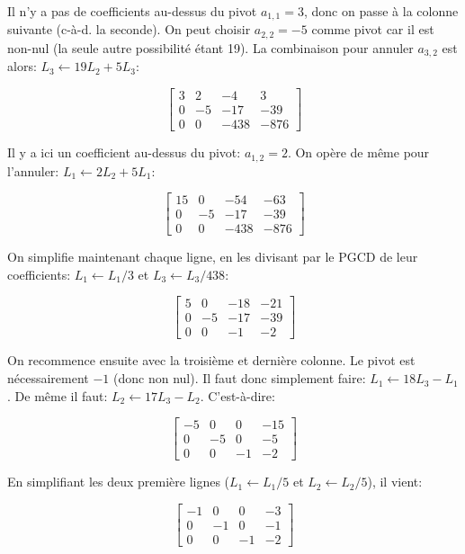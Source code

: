 \documentclass[11pt,a4paper]{article}
\begin{document}
Il n'y a pas de coefficients au-dessus du pivot $a_{1,1}=3$, donc on
passe à la colonne suivante (c-à-d. la seconde). On peut choisir
$a_{2,2}=-5$ comme pivot car il est non-nul (la seule autre
possibilité étant 19). La combinaison pour annuler $a_{3,2}$ est
alors: $L_3 \leftarrow 19L_2 + 5L_3$:

\[
\left[
\begin{array}{rrr|r}
3 &  2 &   -4 &    3\\
0 & -5 &  -17 &  -39\\
0 &  0 & -438 & -876
\end{array}
\right]
\]

Il y a ici un coefficient au-dessus du pivot: $a_{1,2}=2$. On opère de
même pour l'annuler: $L_1 \leftarrow 2L_2 + 5L_1$:

\[
\left[
\begin{array}{rrr|r}
15 &  0 &  -54 &  -63\\
 0 & -5 &  -17 &  -39\\
 0 &  0 & -438 & -876
\end{array}
\right]
\]

On simplifie maintenant chaque ligne, en les divisant par le PGCD de
leur coefficients: $L_1 \leftarrow L_1/3$ et $L_3 \leftarrow L_3/438$:

\[
\left[
\begin{array}{rrr|r}
5 &  0 & -18 & -21\\
0 & -5 & -17 & -39\\
0 &  0 &  -1 & -2
\end{array}
\right]
\]

On recommence ensuite avec la troisième et dernière colonne. Le pivot
est nécessairement $-1$ (donc non nul). Il faut donc simplement faire:
$L_1 \leftarrow 18 L_3 - L_1$. De même il faut: $L_2 \leftarrow 17 L_3
- L_2$. C'est-à-dire:

\[
\left[
\begin{array}{rrr|r}
-5 &  0 &  0 & -15\\
 0 & -5 &  0 & -5\\
 0 &  0 & -1 & -2
\end{array}
\right]
\]

En simplifiant les deux première lignes ($L_1 \leftarrow L_1/5$ et
$L_2 \leftarrow L_2/5$), il vient:

\[
\left[
\begin{array}{rrr|r}
-1 &  0 &  0 & -3\\
 0 & -1 &  0 & -1\\
 0 &  0 & -1 & -2
\end{array}
\right]
\]
\end{document}
